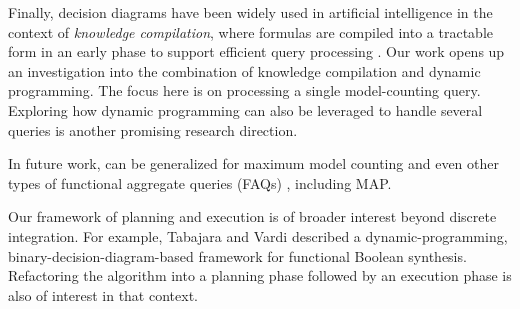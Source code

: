Finally, decision diagrams have been widely used in artificial intelligence in the context of \emph{knowledge compilation}, where formulas are compiled into a tractable form in an early phase to support efficient query processing \cite{koriche2013knowledge,LM17,darwiche2004new,OD15}.
Our work opens up an investigation into the combination of knowledge compilation and dynamic programming.
The focus here is on processing a single model-counting query.
Exploring how dynamic programming can also be leveraged to handle several queries is another promising research direction.


In future work, \procount{} can be generalized for maximum model counting \cite{fremont2017maximum} and even other types of functional aggregate queries (FAQs) \cite{KNR16}, including MAP.

Our framework of planning and execution is of broader interest beyond discrete integration.
For example, Tabajara and Vardi \cite{tabajara2017factored} described a dynamic-programming, binary-decision-diagram-based framework for functional Boolean synthesis.
Refactoring the algorithm into a planning phase followed by an execution phase is also of interest in that context.



